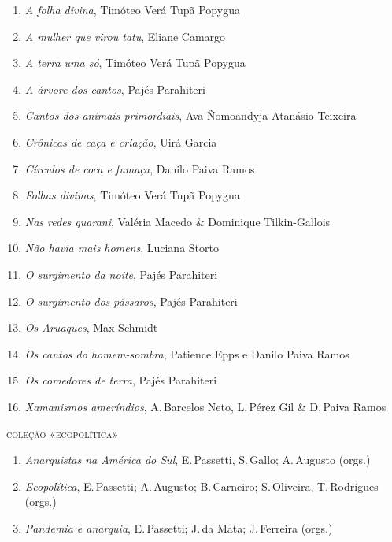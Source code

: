 \begin{enumerate}
\setlength\parskip{4.2pt}
\setlength\itemsep{-1.4mm}
\item \textit{A folha divina}, Timóteo Verá Tupã Popygua
\item \textit{A mulher que virou tatu}, Eliane Camargo
\item \textit{A terra uma só}, Timóteo Verá Tupã Popygua
\item \textit{A árvore dos cantos}, Pajés Parahiteri
\item \textit{Cantos dos animais primordiais}, Ava Ñomoandyja Atanásio Teixeira
\item \textit{Crônicas de caça e criação}, Uirá Garcia
\item \textit{Círculos de coca e fumaça}, Danilo Paiva Ramos
\item \textit{Folhas divinas}, Timóteo Verá Tupã Popygua
\item \textit{Nas redes guarani}, Valéria Macedo \& Dominique Tilkin-Gallois
\item \textit{Não havia mais homens}, Luciana Storto
\item \textit{O surgimento da noite}, Pajés Parahiteri
\item \textit{O surgimento dos pássaros}, Pajés Parahiteri
\item \textit{Os Aruaques}, Max Schmidt
\item \textit{Os cantos do homem-sombra}, Patience Epps e Danilo Paiva Ramos
\item \textit{Os comedores de terra}, Pajés Parahiteri
\item \textit{Xamanismos ameríndios}, A.\,Barcelos Neto, L.\,Pérez Gil \& D.\,Paiva Ramos
\end{enumerate}

\medskip
{\large\textsc{coleção «ecopolítica»}}

\begin{enumerate}
\setlength\parskip{4.2pt}
\setlength\itemsep{-1.4mm}
\item \textit{Anarquistas na América do Sul}, E.\,Passetti, S.\,Gallo; A.\,Augusto  (orgs.)
\item \textit{Ecopolítica}, E.\,Passetti; A.\,Augusto; B.\,Carneiro; S.\,Oliveira, T.\,Rodrigues  (orgs.)
\item \textit{Pandemia e anarquia}, E.\,Passetti; J.\,da Mata; J.\,Ferreira  (orgs.)
\end{enumerate}


